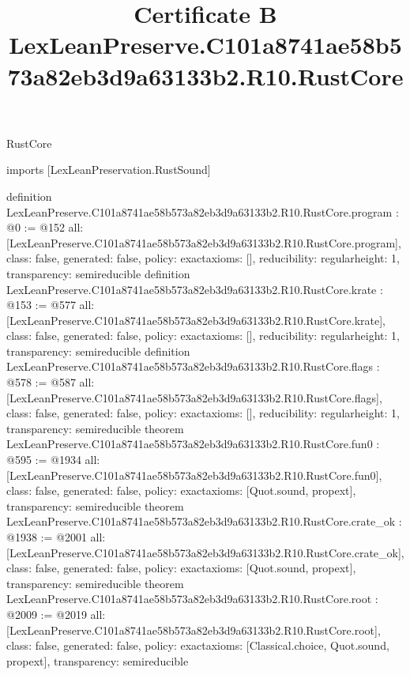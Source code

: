 \begin{lexlean}{RustCore}
\title{Certificate B LexLeanPreserve.C101a8741ae58b573a82eb3d9a63133b2.R10.RustCore}
\begin{coremodule}
imports [LexLeanPreservation.RustSound]

definition LexLeanPreserve.C101a8741ae58b573a82eb3d9a63133b2.R10.RustCore.program : @0 := @152 {
  all: [LexLeanPreserve.C101a8741ae58b573a82eb3d9a63133b2.R10.RustCore.program],
  class: false,
  generated: false,
  policy: exact{axioms: []},
  reducibility: regular{height: 1},
  transparency: semireducible
}
definition LexLeanPreserve.C101a8741ae58b573a82eb3d9a63133b2.R10.RustCore.krate : @153 := @577 {
  all: [LexLeanPreserve.C101a8741ae58b573a82eb3d9a63133b2.R10.RustCore.krate],
  class: false,
  generated: false,
  policy: exact{axioms: []},
  reducibility: regular{height: 1},
  transparency: semireducible
}
definition LexLeanPreserve.C101a8741ae58b573a82eb3d9a63133b2.R10.RustCore.flags : @578 := @587 {
  all: [LexLeanPreserve.C101a8741ae58b573a82eb3d9a63133b2.R10.RustCore.flags],
  class: false,
  generated: false,
  policy: exact{axioms: []},
  reducibility: regular{height: 1},
  transparency: semireducible
}
theorem LexLeanPreserve.C101a8741ae58b573a82eb3d9a63133b2.R10.RustCore.fun0 : @595 := @1934 {
  all: [LexLeanPreserve.C101a8741ae58b573a82eb3d9a63133b2.R10.RustCore.fun0],
  class: false,
  generated: false,
  policy: exact{axioms: [Quot.sound, propext]},
  transparency: semireducible
}
theorem LexLeanPreserve.C101a8741ae58b573a82eb3d9a63133b2.R10.RustCore.crate_ok : @1938 := @2001 {
  all: [LexLeanPreserve.C101a8741ae58b573a82eb3d9a63133b2.R10.RustCore.crate_ok],
  class: false,
  generated: false,
  policy: exact{axioms: [Quot.sound, propext]},
  transparency: semireducible
}
theorem LexLeanPreserve.C101a8741ae58b573a82eb3d9a63133b2.R10.RustCore.root : @2009 := @2019 {
  all: [LexLeanPreserve.C101a8741ae58b573a82eb3d9a63133b2.R10.RustCore.root],
  class: false,
  generated: false,
  policy: exact{axioms: [Classical.choice, Quot.sound, propext]},
  transparency: semireducible
}


\end{coremodule}
\end{lexlean}
